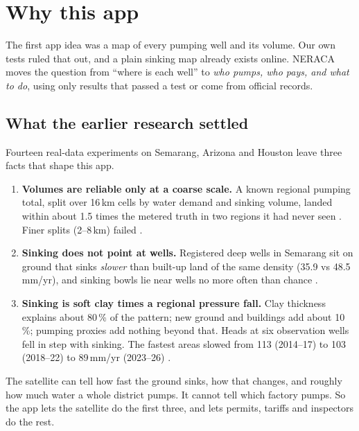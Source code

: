 \section{Why this app}\label{sec:why}

\begin{inshort}
The first app idea was a map of every pumping well and its volume. Our own tests ruled that out, and a
plain sinking map already exists online. NERACA moves the question from ``where is each well'' to
\emph{who pumps, who pays, and what to do}, using only results that passed a test or come from official
records.
\end{inshort}

\subsection{What the earlier research settled}\label{sec:found}

Fourteen real-data experiments on Semarang, Arizona and Houston \cite{exp15} leave three facts that shape
this app.

\begin{enumerate}
\item \textbf{Volumes are reliable only at a coarse scale.} A known regional pumping total, split over
  16\,km cells by water demand and sinking volume, landed within about 1.5 times the metered truth in two
  regions it had never seen \cite{exp09}. Finer splits (2--8\,km) failed \cite{exp12}.
\item \textbf{Sinking does not point at wells.} Registered deep wells in Semarang sit on ground that sinks
  \emph{slower} than built-up land of the same density (35.9 vs 48.5\,mm/yr), and sinking bowls lie near
  wells no more often than chance \cite{exp13}.
\item \textbf{Sinking is soft clay times a regional pressure fall.} Clay thickness explains about 80\,\% of
  the pattern; new ground and buildings add about 10\,\%; pumping proxies add nothing beyond that. Heads at
  six observation wells fell in step with sinking. The fastest areas slowed from 113 (2014--17) to 103
  (2018--22) to 89\,mm/yr (2023--26) \cite{exp14}.
\end{enumerate}

\begin{plain}
The satellite can tell how fast the ground sinks, how that changes, and roughly how much water a whole
district pumps. It cannot tell which factory pumps. So the app lets the satellite do the first three, and
lets permits, tariffs and inspectors do the rest.
\end{plain}

